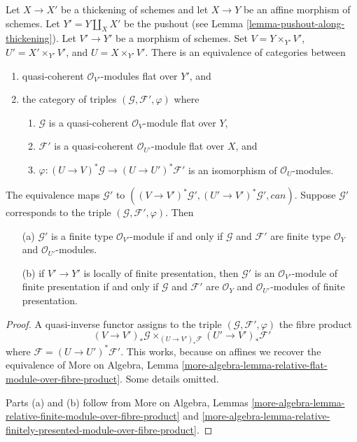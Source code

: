 \begin{lemma}
\label{lemma-scheme-over-pushout-flat-modules}
Let $X \to X'$ be a thickening of schemes and let $X \to Y$ be an
affine morphism of schemes. Let $Y' = Y \amalg_X X'$ be the pushout
(see Lemma \ref{lemma-pushout-along-thickening}). Let $V' \to Y'$
be a morphism of schemes. Set
$V = Y \times_{Y'} V'$, $U' = X' \times_{Y'} V'$, and $U = X \times_{Y'} V'$.
There is an equivalence of categories between
\begin{enumerate}
\item quasi-coherent $\mathcal{O}_{V'}$-modules flat over $Y'$, and
\item the category of triples $(\mathcal{G}, \mathcal{F}', \varphi)$ where
\begin{enumerate}
\item $\mathcal{G}$ is a quasi-coherent $\mathcal{O}_V$-module flat over $Y$,
\item $\mathcal{F}'$ is a quasi-coherent $\mathcal{O}_{U'}$-module flat
over $X$, and
\item $\varphi : (U \to V)^*\mathcal{G} \to (U \to U')^*\mathcal{F}'$
is an isomorphism of $\mathcal{O}_U$-modules.
\end{enumerate}
\end{enumerate}
The equivalence maps $\mathcal{G}'$ to
$((V \to V')^*\mathcal{G}', (U' \to V')^*\mathcal{G}', can)$.
Suppose $\mathcal{G}'$ corresponds to the triple
$(\mathcal{G}, \mathcal{F}', \varphi)$. Then
\begin{enumerate}
\item[(a)] $\mathcal{G}'$ is a finite type $\mathcal{O}_{V'}$-module if and
only if $\mathcal{G}$ and $\mathcal{F}'$ are finite type
$\mathcal{O}_Y$ and $\mathcal{O}_{U'}$-modules.
\item[(b)] if $V' \to Y'$ is locally of finite presentation, then
$\mathcal{G}'$ is an $\mathcal{O}_{V'}$-module of finite
presentation if and only if $\mathcal{G}$ and $\mathcal{F}'$ are
$\mathcal{O}_Y$ and $\mathcal{O}_{U'}$-modules of finite presentation.
\end{enumerate}
\end{lemma}

\begin{proof}
A quasi-inverse functor assigns to the triple
$(\mathcal{G}, \mathcal{F}', \varphi)$ the fibre product
$$
(V \to V')_*\mathcal{G}
\times_{(U \to V')_*\mathcal{F}}
(U' \to V')_*\mathcal{F}'
$$
where $\mathcal{F} = (U \to U')^*\mathcal{F}'$. This works, because on
affines we recover the equivalence of More on Algebra, Lemma
\ref{more-algebra-lemma-relative-flat-module-over-fibre-product}.
Some details omitted.

\medskip\noindent
Parts (a) and (b) follow from
More on Algebra, Lemmas
\ref{more-algebra-lemma-relative-finite-module-over-fibre-product} and
\ref{more-algebra-lemma-relative-finitely-presented-module-over-fibre-product}.
\end{proof}

